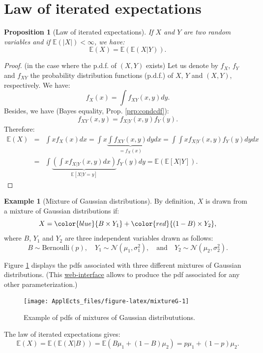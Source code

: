 \documentclass[
  12pt,
]{book}
\newtheorem{proposition}{Proposition}[chapter]
\theoremstyle{definition}
\theoremstyle{definition}
\newtheorem{example}{Example}[chapter]
\theoremstyle{definition}
\theoremstyle{definition}
\theoremstyle{remark}
\begin{document}
\hypertarget{law-of-iterated-expectations}{%
\section{Law of iterated expectations}\label{law-of-iterated-expectations}}

\begin{proposition}[Law of iterated expectations]
\protect\hypertarget{prp:lawiteratedexpect}{}\label{prp:lawiteratedexpect}If \(X\) and \(Y\) are two random variables and if \(\mathbb{E}(|X|)<\infty\), we have:
\[
\boxed{\mathbb{E}(X) = \mathbb{E}(\mathbb{E}(X|Y)).}
\]
\end{proposition}

\begin{proof}
(in the case where the p.d.f. of \((X,Y)\) exists) Let us denote by \(f_X\), \(f_Y\) and \(f_{XY}\) the probability distribution functions (p.d.f.) of \(X\), \(Y\) and \((X,Y)\), respectively. We have:
\[
f_{X}(x) = \int f_{XY}(x,y) dy.
\]
Besides, we have (Bayes equality, Prop. \ref{prp:condcdf}):
\[
f_{XY}(x,y) = f_{X|Y}(x,y)f_{Y}(y).
\]
Therefore:
\begin{eqnarray*}
\mathbb{E}(X) &=& \int x f_X(x)dx = \int x  \underbrace{ \int  f_{XY}(x,y) dy}_{=f_X(x)} dx =\int  \int x f_{X|Y}(x,y)f_{Y}(y) dydx \\
& = & \int \underbrace{\left(\int x f_{X|Y}(x,y)dx\right)}_{\mathbb{E}[X|Y=y]}f_{Y}(y) dy = \mathbb{E} \left( \mathbb{E}[X|Y] \right).
\end{eqnarray*}
\end{proof}

\begin{example}[Mixture of Gaussian distributions]
\protect\hypertarget{exm:mixture}{}\label{exm:mixture}By definition, \(X\) is drawn from a mixture of Gaussian distributions if:
\[
X = \color{blue}{B \times Y_1} + \color{red}{(1-B) \times Y_2},
\]
where \(B\), \(Y_1\) and \(Y_2\) are three independent variables drawn as follows:
\[
B \sim \mbox{Bernoulli}(p),\quad Y_1 \sim \mathcal{N}(\mu_1,\sigma_1^2), \quad \mbox{and}\quad Y_2 \sim \mathcal{N}(\mu_2,\sigma_2^2).
\]

Figure \ref{fig:mixtureG} displays the pdfs associated with three different mixtures of Gaussian distributions. (This \href{https://jrenne.shinyapps.io/density/}{web-interface} allows to produce the pdf associated for any other parameterization.)

\begin{figure}
\texttt{[image: ApplEcts\_files/figure-latex/mixtureG-1]} \caption{Example of pdfs of mixtures of Gaussian distribututions.}\label{fig:mixtureG}
\end{figure}

The law of iterated expectations gives:
\[
\mathbb{E}(X) = \mathbb{E}(\mathbb{E}(X|B)) = \mathbb{E}(B\mu_1+(1-B)\mu_2)=p\mu_1 + (1-p)\mu_2.
\]
\end{example}
\end{document}
